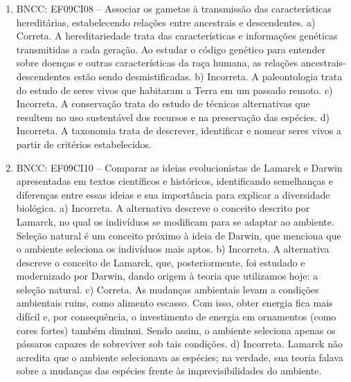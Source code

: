 
\begin{enumerate}
\item
BNCC: EF09CI08 -- Associar os gametas à transmissão
das características hereditárias, estabelecendo relações entre
ancestrais e descendentes.
a) Correta. A hereditariedade trata das características e
  informações genéticas transmitidas a cada geração. Ao estudar o código
  genético para entender sobre doenças e outras características da raça
  humana, as relações ancestrais-descendentes estão sendo desmistificadas.
b) Incorreta. A paleontologia trata do estudo de seres vivos que
  habitaram a Terra em um passado remoto.
c) Incorreta. A conservação trata do estudo de técnicas alternativas
  que resultem no uso sustentável dos recursos e na preservação das
  espécies.
d) Incorreta. A taxonomia trata de descrever, identificar e nomear
  seres vivos a partir de critérios estabelecidos.

\item
BNCC: EF09CI10 -- Comparar as ideias evolucionistas de
Lamarck e Darwin apresentadas em textos científicos e históricos,
identificando semelhanças e diferenças entre essas ideias e sua
importância para explicar a diversidade biológica.
a) Incorreta. A alternativa descreve o conceito descrito por
  Lamarck, no qual os indivíduos se modificam para se adaptar ao
  ambiente. Seleção natural é um conceito próximo à ideia de Darwin, que
  menciona que o ambiente seleciona os indivíduos mais aptos.
b) Incorreta. A alternativa descreve o conceito de Lamarck, que,
  posteriormente, foi estudado e modernizado por Darwin, dando origem à
  teoria que utilizamos hoje: a seleção natural.
c) Correta. As mudanças ambientais levam a condições ambientais
  ruins, como alimento escasso. Com isso, obter energia fica
  mais difícil e, por consequência, o investimento de energia em
  ornamentos (como cores fortes) também diminui. Sendo assim, o ambiente
  seleciona apenas os pássaros capazes de sobreviver sob tais condições.
d) Incorreta. Lamarck não acredita que o ambiente selecionava as
  espécies; na verdade, sua teoria falava sobre a mudanças das espécies
  frente às imprevisibilidades do ambiente.


\end{enumerate}
